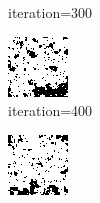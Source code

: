 \documentclass{article}
\begin{document}
\begin{figure}[h]
\begin{subfigure}[t]{0.18\textwidth}
\vspace{-0.6cm}
\caption{iteration=300}
\end{subfigure}\hspace{0.01\textwidth}
\begin{subfigure}[t]{0.18\textwidth}
\centering
\includegraphics[width=\textwidth]{./computational/results/gibbs_node_sampler_positive_iter_400.png}
\vspace{-0.6cm}
\caption{iteration=400}
\end{subfigure}\hspace{0.01\textwidth}
\begin{subfigure}[t]{0.18\textwidth}
\centering
\includegraphics[width=\textwidth]{./computational/results/gibbs_node_sampler_positive_iter_500.png}

\end{subfigure}
\end{figure}
\end{document}
